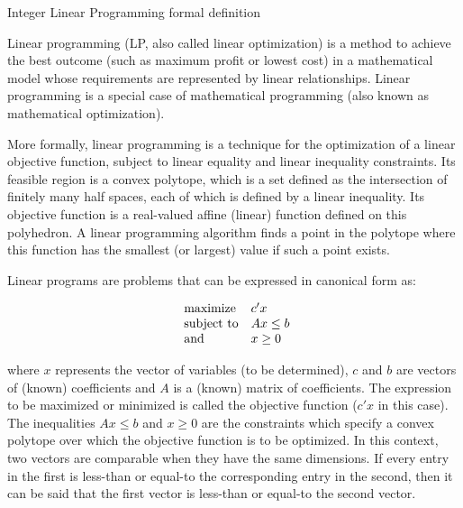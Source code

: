 \documentclass[9pt]{extarticle}
\begin{document}
    \begin{section}{Integer Linear Programming formal definition}

        Linear programming (LP, also called linear optimization) is a method to achieve the best outcome (such as maximum 
        profit or lowest cost) in a mathematical model whose requirements are represented by linear relationships. 
        Linear programming is a special case of mathematical programming (also known as mathematical optimization).
        \cite{wiki:lp}

        More formally, linear programming is a technique for the optimization of a linear objective function, subject to 
        linear equality and linear inequality constraints. 
        Its feasible region is a convex polytope, which is a set defined as the intersection of finitely many half spaces, 
        each of which is defined by a linear inequality. 
        Its objective function is a real-valued affine (linear) function defined on this polyhedron. 
        A linear programming algorithm finds a point in the polytope where this function has the smallest (or largest) 
        value if such a point exists.
        \cite{wiki:lp}

        Linear programs are problems that can be expressed in canonical form as:
        
        \begin{equation*}
            \begin{array}{ll@{}ll}
                \text{maximize}  & c'x \\
                \text{subject to} & Ax \leq b \\
                \text{and} & x \ge 0
            \end{array}
        \end{equation*}

        where $x$ represents the vector of variables (to be determined), $c$ and $b$ are vectors of (known) coefficients and 
        $A$ is a (known) matrix of coefficients.
        The expression to be maximized or minimized is called the objective function ($c'x$ in this case). 
        The inequalities $Ax \leq b$ and $x \ge 0$ are the constraints which specify a convex polytope over which the objective 
        function is to be optimized. 
        In this context, two vectors are comparable when they have the same dimensions. 
        If every entry in the first is less-than or equal-to the corresponding entry in the second, then it can be said 
        that the first vector is less-than or equal-to the second vector.
        \cite{wiki:lp}


\end{section}
\end{document}

